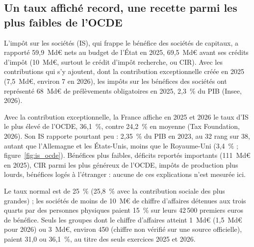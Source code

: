 
\subsection{Un taux affiché record, une recette parmi les plus faibles de l'OCDE}\label{sec:is_situation}

L'impôt sur les sociétés (IS), qui frappe le bénéfice des sociétés de capitaux, a rapporté 59,9~Md€ nets au budget
de l'État en 2025, 69,5~Md€ avant ses crédits d'impôt (10~Md€, surtout le crédit d'impôt recherche, ou CIR). Avec les contributions qui s'y ajoutent,
dont la contribution exceptionnelle créée en 2025 (7,5~Md€, environ 7 en 2026), les impôts sur les bénéfices des
sociétés ont représenté 68~Md€ de prélèvements obligatoires en 2025, 2,3~\% du PIB (Insee, 2026).

Avec la contribution exceptionnelle, la France affiche en 2025 et 2026 le taux d'IS le plus élevé de l'OCDE, 36,1~\%,
contre 24,2~\% en moyenne (Tax Foundation, 2026). Son IS rapporte pourtant peu : 2,35~\% du PIB en 2023, au
32 rang sur 38, autant que l'Allemagne et les États-Unis, moins que le Royaume-Uni (3,4~\% ; figure~\ref{fig:is_ocde}). Bénéfices plus
faibles, déficits reportés importants (111~Md€ en 2025), CIR parmi les plus généreux de l'OCDE, impôts de production
plus lourds, bénéfices logés à l'étranger : aucune de ces explications n'est mesurée ici.


Le taux normal est de 25~\% (25,8~\% avec la
contribution sociale des plus grandes) ; les sociétés de moins de 10~M€ de chiffre d'affaires détenues aux trois quarts
par des personnes physiques paient 15~\% sur leurs 42\,500 premiers euros de bénéfice. Seuls les groupes dont le chiffre
d'affaires atteint 1~Md€ (1,5~Md€ pour 2026) ou 3~Md€, environ 450 (chiffre non vérifié sur une source officielle),
paient 31,0 ou 36,1~\%, au titre des seuls exercices 2025 et 2026.

